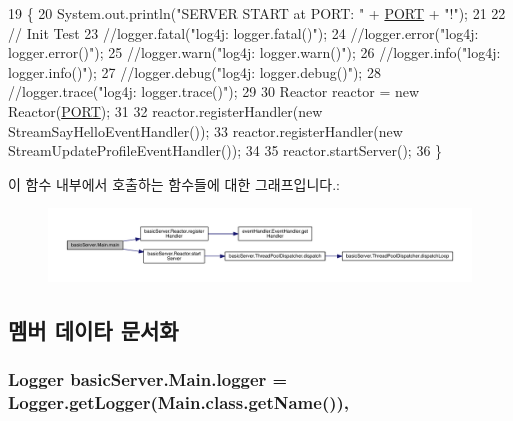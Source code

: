 \begin{DoxyCode}
19                                            \{
20         System.out.println(\textcolor{stringliteral}{"SERVER START at PORT: "} + \hyperlink{classbasic_server_1_1_main_af83ee27a3ec7ae49bcfed0bc78bd32ca}{PORT} + \textcolor{stringliteral}{"!"});
21         
22         \textcolor{comment}{// Init Test}
23         \textcolor{comment}{//logger.fatal("log4j: logger.fatal()");}
24         \textcolor{comment}{//logger.error("log4j: logger.error()");}
25         \textcolor{comment}{//logger.warn("log4j: logger.warn()");}
26         \textcolor{comment}{//logger.info("log4j: logger.info()");}
27         \textcolor{comment}{//logger.debug("log4j: logger.debug()");}
28         \textcolor{comment}{//logger.trace("log4j: logger.trace()");}
29 
30         Reactor reactor = \textcolor{keyword}{new} Reactor(\hyperlink{classbasic_server_1_1_main_af83ee27a3ec7ae49bcfed0bc78bd32ca}{PORT});
31 
32         reactor.registerHandler(\textcolor{keyword}{new} StreamSayHelloEventHandler());
33         reactor.registerHandler(\textcolor{keyword}{new} StreamUpdateProfileEventHandler());
34 
35         reactor.startServer();
36     \}
\end{DoxyCode}


이 함수 내부에서 호출하는 함수들에 대한 그래프입니다.\+:\nopagebreak
\begin{figure}[H]
\begin{center}
\leavevmode
\includegraphics[width=350pt]{classbasic_server_1_1_main_a0c7ee477ff533ef286ecf5a95148eda8_cgraph}
\end{center}
\end{figure}




\subsection{멤버 데이타 문서화}
\hypertarget{classbasic_server_1_1_main_a41d7399aaeba39a260abea976c89600b}{
\subsubsection[{logger}]{\setlength{\rightskip}{0pt plus 5cm}Logger basic\+Server.\+Main.\+logger = Logger.\+get\+Logger(Main.\+class.\+get\+Name())\hspace{0.3cm}{\ttfamily [static]}, {\ttfamily [private]}}}\label{classbasic_server_1_1_main_a41d7399aaeba39a260abea976c89600b}


